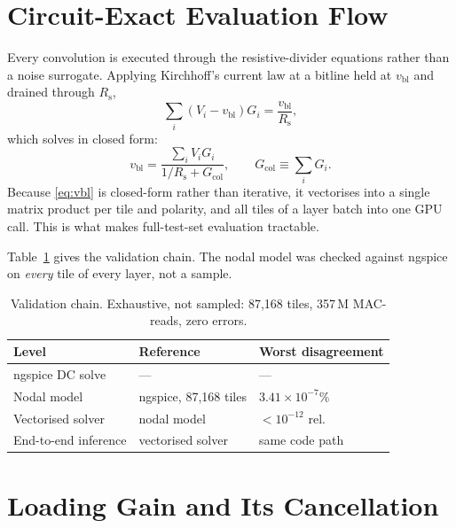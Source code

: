 \documentclass[conference,10pt]{IEEEtran}
\newcommand{\Rs}{R_{\mathrm{s}}}
\newcommand{\Gcol}{G_{\mathrm{col}}}
\begin{document}
\section{Circuit-Exact Evaluation Flow}
\label{sec:method}

Every convolution is executed through the resistive-divider equations rather
than a noise surrogate. Applying Kirchhoff's current law at a bitline held at
$v_{\mathrm{bl}}$ and drained through $\Rs$,
\begin{equation}
\sum_i (V_i - v_{\mathrm{bl}})G_i = \frac{v_{\mathrm{bl}}}{\Rs},
\label{eq:kcl}
\end{equation}
which solves in closed form:
\begin{equation}
v_{\mathrm{bl}} = \frac{\sum_i V_i G_i}{1/\Rs + \Gcol},
\qquad \Gcol \equiv \sum_i G_i .
\label{eq:vbl}
\end{equation}
Because \eqref{eq:vbl} is closed-form rather than iterative, it vectorises into
a single matrix product per tile and polarity, and all tiles of a layer batch
into one GPU call. This is what makes full-test-set evaluation tractable.

Table~\ref{tab:valid} gives the validation chain. The nodal model was checked
against ngspice~\cite{ngspice} on \emph{every} tile of every layer, not a
sample.

\begin{table}[t]
\centering
\caption{Validation chain. Exhaustive, not sampled: 87{,}168 tiles,
357\,M MAC-reads, zero errors.}
\label{tab:valid}
\begin{tabular}{lll}
\toprule
Level & Reference & Worst disagreement \\
\midrule
ngspice DC solve & --- & --- \\
Nodal model & ngspice, 87{,}168 tiles & $3.41\times10^{-7}$\% \\
Vectorised solver & nodal model & $<10^{-12}$ rel. \\
End-to-end inference & vectorised solver & same code path \\
\bottomrule
\end{tabular}
\end{table}

\section{Loading Gain and Its Cancellation}
\label{sec:fix}
\end{document}
